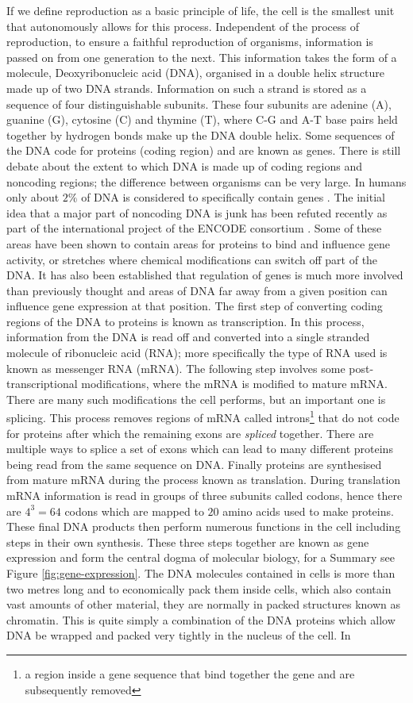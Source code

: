 If we define reproduction as a basic principle of life, the cell is the smallest unit that autonomously allows for this process. Independent of the process of reproduction, to ensure a faithful reproduction of organisms, information is passed on from one generation to the next. This information takes the form of a molecule, Deoxyribonucleic acid (DNA), organised in a double helix structure made up of two DNA strands. Information on such a strand is stored as a sequence of four distinguishable subunits. These four subunits are adenine (A), guanine (G), cytosine (C) and thymine (T), where C-G and A-T base pairs held together by hydrogen bonds make up the DNA double helix. Some sequences of the DNA code for proteins (coding region) and are known as genes.  There is still debate about the extent to which DNA is made up of coding regions and noncoding regions; the difference between organisms can be very large. In humans only about $2\%$ of DNA is considered to specifically contain genes \citep{Elgar:2008dm}. The initial idea that a major part of noncoding DNA is junk has been refuted recently as part of the international project of the ENCODE consortium \citep{Pennisi:2012wl}. Some of these areas have been shown to contain areas for proteins to bind and influence gene activity, or stretches where chemical modifications can  switch off part of the DNA. It has also been established that regulation of genes is much more involved than previously thought and areas of DNA far away from a given position can influence gene expression at that position. The first step of converting coding regions of the DNA to proteins is known as transcription. In this process, information from the DNA is read off and converted into a single stranded molecule of ribonucleic acid (RNA); more specifically the type of RNA used is known as messenger RNA (mRNA). The following step involves some post-transcriptional modifications, where the mRNA is modified to mature mRNA. There are many such modifications the cell performs, but an important one is splicing. This process removes regions of mRNA called introns\footnote{a region inside a gene sequence that bind together the gene and are subsequently removed} that do not code for proteins after which the remaining exons are \emph{spliced} together. There are multiple ways to splice a set of exons which can lead to many different proteins being read from the same sequence on DNA. Finally proteins are synthesised from mature mRNA during the process known as translation. During translation mRNA information is read in groups of three subunits called codons, hence there are $4^3 = 64$ codons which are mapped to $20$ amino acids used to make proteins. These final DNA products then perform numerous functions in the cell including steps in their own synthesis. These three steps together are known as gene expression and form the central dogma of molecular biology, for a Summary see Figure \ref{fig:gene-expression}. The DNA molecules contained in cells is more than two metres long and to economically pack them inside cells, which also contain vast amounts of other material, they are normally in packed structures known as chromatin. This is quite simply a combination of the DNA proteins which allow DNA be wrapped and packed very tightly in the nucleus of the cell. In 